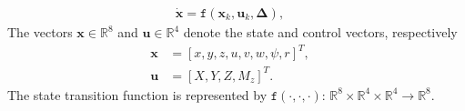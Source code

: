 %
\begin{align} \label{eq:model_eqs}
    \dot{\mathbf{x}} = \mathtt{f}(\mathbf{x}_k,\mathbf{u}_k, \mathbf{\Delta}),  \quad
\end{align}
%
 The vectors $\mathbf{x} \in \mathbb{R}^{8}$ and $\mathbf{u} \in \mathbb{R}^{4}$  denote the state and control vectors, respectively
%
\begin{align}
\label{eq:state_control} 
    \mathbf{x} &= [x,y,z,u,v,w, \psi, r]^T, \quad  \\
    \label{eq:control} 
    \mathbf{u} &= [X,Y,Z,M_z]^T.
\end{align}
%
The state transition function is represented by $\mathtt{f}(\cdot,\cdot, \cdot)$: $\mathbb{R}^{8} \times \mathbb{R}^{4} \times 
 \mathbb{R}^{4} \rightarrow \mathbb{R}^{8}$.

 


















 



 

